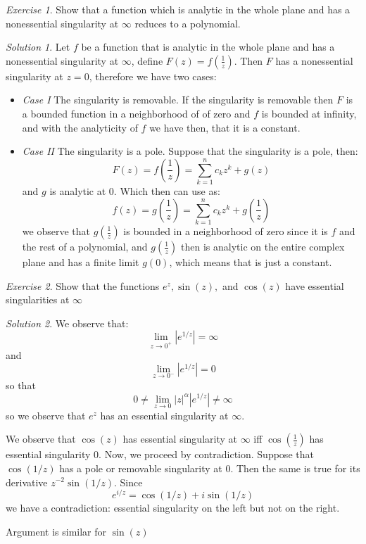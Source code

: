 \documentclass[notitlepage]{article}
\theoremstyle{definition}
\theoremstyle{remark}
\newtheorem{exc}{Exercise}
\newtheorem*{sol}{Solution}
\newcommand{\lrp}[1]{\left( #1 \right)}
\newcommand{\abs}[1]{\left| #1 \right|}
\begin{document}
\begin{exc}
	Show that a function which is analytic in the whole plane and has a nonessential singularity at $ \infty $ reduces to a polynomial.
\end{exc}
\begin{sol}
	Let $ f $ be a function that is analytic in the whole plane and has a nonessential singularity at $ \infty $, define $ F(z) = f(\frac{1}{z}) $. Then $ F $ has a nonessential singularity at $ z = 0 $, therefore we have two cases:
	
	\begin{itemize}
		\item \textit{Case I} The singularity is removable. If the singularity is removable then $ F $ is a bounded function in a neighborhood of of zero and $ f $ is bounded at infinity, and with the analyticity of $ f $ we have then, that it is a constant.
		\item \textit{Case II} The singularity is a pole. Suppose that the singularity is a pole, then:
		\[ F(z) = f(\frac{1}{z}) = \sum_{k = 1}^{n} c_k z^k + g(z) \]
			and $ g $ is analytic at $ 0 $. Which then can use as:
			\[ f(z) = g\lrp{\frac{1}{z}} = \sum_{k = 1 }^{n}c_k z^k + g(\frac{1}{z}) \]
			we observe that $ g(\frac{1}{z}) $ is bounded in a neighborhood of zero since it is $ f $ and the rest of a polynomial, and $ g(\frac{1}{z}) $ then is analytic on the entire complex plane and has a finite limit $ g(0) $, which means that is just a constant.
	\end{itemize}

\end{sol}
\begin{exc}
	Show that the functions $ e^z, \sin(z), $ and $ \cos(z) $ have essential singularities at $ \infty $
\end{exc}
\begin{sol}
	We observe that:
	\[ \lim\limits_{z \rightarrow 0^+} \abs{e^{1/z}} = \infty \]
	and 
	\[ \lim\limits_{z \rightarrow 0^-} \abs{e^{1/z}} = 0 \]
	so that 
	\[ 0 \neq \lim\limits_{z \rightarrow 0} \abs{z}^{\alpha}\abs{e^{1/z}} \neq \infty \]
	so we observe that $ e^z $ has an essential singularity at $ \infty $.
	
	We observe that $ \cos(z) $ has essential singularity at $ \infty $ iff $ \cos(\frac{1}{z}) $ has essential singularity $ 0 $. Now, we proceed by contradiction. Suppose that $\cos (1/z)$   has a pole or removable singularity at $0$. Then the same is true for its derivative $z^{-2}\sin (1/z)$.	Since 
	$$e^{i/z}=\cos (1/z)+i\sin(1/z)$$
	we have a contradiction: essential singularity on the left but not on the right.
	
	Argument is similar for $ \sin(z) $ 
\end{sol}
\end{document}
